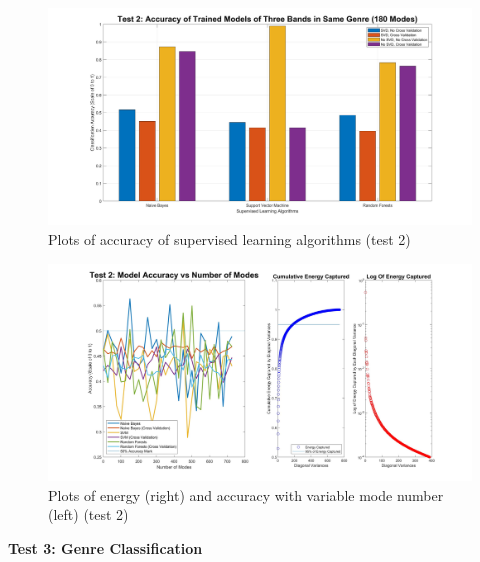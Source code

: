 \documentclass{article}
\begin{document}
\begin{figure}[H]
\begin{center}
\includegraphics[width = 16cm]{acc2}
\caption{\label{fig:scaled_diss}  Plots of accuracy of supervised learning algorithms (test 2)}
\end{center}
\end{figure}
\begin{figure}[H]
\begin{center}
\includegraphics[width = 18cm]{use2}
\caption{\label{fig:scaled_diss} Plots of energy (right) and accuracy with variable mode number (left) (test 2)}
\end{center}
\end{figure}
\textbf{Test 3: Genre Classification}
\end{document}
